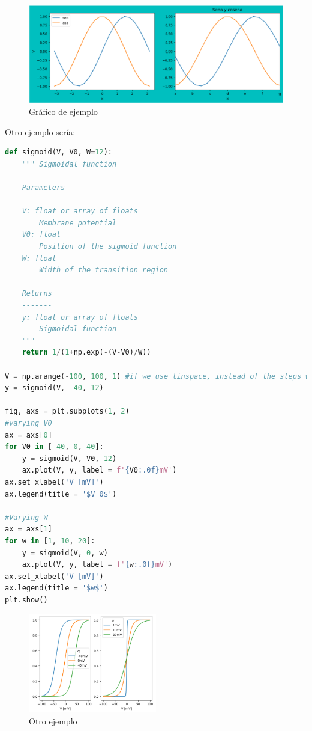 \begin{figure}[htbp]
\centering
\includegraphics[width = \textwidth]{figs/plt1.png}
\caption{Gráfico de ejemplo}
\label{fig:plt1}
\end{figure}

Otro ejemplo sería:
\begin{lstlisting}[language=Python]
def sigmoid(V, V0, W=12):
    """ Sigmoidal function
    
    Parameters
    ----------
    V: float or array of floats
        Membrane potential
    V0: float
        Position of the sigmoid function
    W: float
        Width of the transition region
        
    Returns
    -------
    y: float or array of floats
        Sigmoidal function    
    """
    return 1/(1+np.exp(-(V-V0)/W))

V = np.arange(-100, 100, 1) #if we use linspace, instead of the steps we put how many values we want
y = sigmoid(V, -40, 12)

fig, axs = plt.subplots(1, 2)
#varying V0
ax = axs[0]
for V0 in [-40, 0, 40]:
    y = sigmoid(V, V0, 12)
    ax.plot(V, y, label = f'{V0:.0f}mV')
ax.set_xlabel('V [mV]')
ax.legend(title = '$V_0$')

#Varying W 
ax = axs[1]
for w in [1, 10, 20]:
    y = sigmoid(V, 0, w)
    ax.plot(V, y, label = f'{w:.0f}mV')
ax.set_xlabel('V [mV]')
ax.legend(title = '$w$')
plt.show()
\end{lstlisting}

\begin{figure}[htbp]
\centering
\includegraphics[width = 0.5\textwidth]{figs/plt2.png}
\caption{Otro ejemplo}
\label{fig:plt2}
\end{figure}

